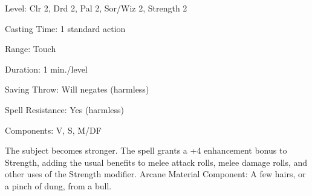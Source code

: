 
\begin{description*}
\item[Level:] Clr 2, Drd 2, Pal 2, Sor/Wiz 2, Strength 2
\item[Casting Time:] 1 standard action
\item[Range:] Touch
\item[Duration:] 1 min./level
\item[Saving Throw:] Will negates (harmless)
\item[Spell Resistance:] Yes (harmless)
\item[Components:] V, S, M/DF
\end{description*}

The subject becomes stronger. The spell grants a +4 enhancement bonus to Strength,
adding the usual benefits to melee attack rolls, melee damage rolls, and other
uses of the Strength modifier.
Arcane Material Component: A few hairs, or a pinch of dung, from a bull.
